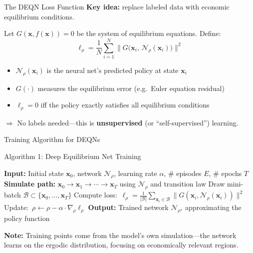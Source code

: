 \documentclass[aspectratio=169,11pt]{beamer}
\newcommand{\emphc}[1]{\textcolor{harvardcrimson}{#1}}
\newcommand{\x}{\bm{x}}
\begin{document}
\begin{frame}{The DEQN Loss Function}
\textbf{Key idea:} replace labeled data with \emphc{economic equilibrium conditions}.

\vspace{0.5em}
Let $G(\x, f(\x)) = 0$ be the system of equilibrium equations. Define:
\[
\boxed{
\ell_\rho = \frac{1}{N} \sum_{i=1}^{N} \bigl\| G\bigl(\x_i,\, \mathcal{N}_\rho(\x_i)\bigr) \bigr\|^2
}
\]

\vspace{0.3em}
\begin{itemize}
    \item $\mathcal{N}_\rho(\x_i)$ is the neural net's \emphc{predicted policy} at state $\x_i$
    \item $G(\cdot)$ measures the \emphc{equilibrium error} (e.g.\ Euler equation residual)
    \item $\ell_\rho = 0$ iff the policy \emphc{exactly} satisfies all equilibrium conditions
\end{itemize}

\vspace{0.5em}
$\Rightarrow$ \emphc{No labels needed}---this is \textbf{unsupervised} (or ``self-supervised'') learning.
\end{frame}

\begin{frame}{Training Algorithm for DEQNs}
\begin{block}{Algorithm 1: Deep Equilibrium Net Training}
\begin{algorithmic}
\footnotesize
\STATE \textbf{Input:} Initial state $\x_0$, network $\mathcal{N}_\rho$, learning rate $\alpha$, \# episodes $E$, \# epochs $T$
    \STATE \textbf{Simulate path:} $\x_0 \to \x_1 \to \cdots \to \x_T$ using $\mathcal{N}_\rho$ and transition law
        \STATE Draw mini-batch $\mathcal{B} \subset \{\x_0, \ldots, \x_T\}$
        \STATE Compute loss:~$\ell_\rho = \frac{1}{|\mathcal{B}|}\sum_{\x_i \in \mathcal{B}} \|G(\x_i, \mathcal{N}_\rho(\x_i))\|^2$
        \STATE Update:~$\rho \leftarrow \rho - \alpha \cdot \nabla_\rho \ell_\rho$
    \ENDFOR
\ENDFOR
\STATE \textbf{Output:} Trained network $\mathcal{N}_{\rho^\star}$ approximating the policy function
\end{algorithmic}
\end{block}

\vspace{0.2em}
{\small \textbf{Note:} Training points come from the \emphc{model's own simulation}---the network learns on the ergodic distribution, focusing on economically relevant regions.}
\end{frame}
\end{document}
